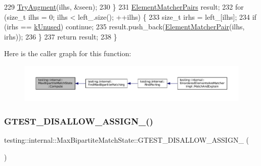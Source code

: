 \begin{DoxyCode}
229       \hyperlink{classtesting_1_1internal_1_1MaxBipartiteMatchState_a8aa8dc82be659772a1dd68eb00d7a858}{TryAugment}(ilhs, &seen);
230     \}
231     \hyperlink{namespacetesting_1_1internal_a0038618710c01a71150887dc7cfb0a29}{ElementMatcherPairs} result;
232     \textcolor{keywordflow}{for} (\textcolor{keywordtype}{size\_t} ilhs = 0; ilhs < left\_.size(); ++ilhs) \{
233       \textcolor{keywordtype}{size\_t} irhs = left\_[ilhs];
234       \textcolor{keywordflow}{if} (irhs == \hyperlink{classtesting_1_1internal_1_1MaxBipartiteMatchState_a628d16d346432c1556097b94fad27e42}{kUnused}) \textcolor{keywordflow}{continue};
235       result.push\_back(\hyperlink{namespacetesting_1_1internal_a109863545f08651178bf0f520aebd33b}{ElementMatcherPair}(ilhs, irhs));
236     \}
237     \textcolor{keywordflow}{return} result;
238   \}
\end{DoxyCode}
Here is the caller graph for this function\+:
\nopagebreak
\begin{figure}[H]
\begin{center}
\leavevmode
\includegraphics[width=350pt]{classtesting_1_1internal_1_1MaxBipartiteMatchState_af6efab664ee390925b24d023f1368192_icgraph}
\end{center}
\end{figure}
\mbox{\label{classtesting_1_1internal_1_1MaxBipartiteMatchState_a633fb7cfb6634dbbb1b62637efc540f8}} 
\subsubsection{\texorpdfstring{G\+T\+E\+S\+T\+\_\+\+D\+I\+S\+A\+L\+L\+O\+W\+\_\+\+A\+S\+S\+I\+G\+N\+\_\+()}{GTEST\_DISALLOW\_ASSIGN\_()}}
{\footnotesize\ttfamily testing\+::internal\+::\+Max\+Bipartite\+Match\+State\+::\+G\+T\+E\+S\+T\+\_\+\+D\+I\+S\+A\+L\+L\+O\+W\+\_\+\+A\+S\+S\+I\+G\+N\+\_\+ (\begin{DoxyParamCaption}\item[{\hyperlink{classtesting_1_1internal_1_1MaxBipartiteMatchState}{Max\+Bipartite\+Match\+State}}]{ }\end{DoxyParamCaption})\hspace{0.3cm}{\ttfamily [private]}}

